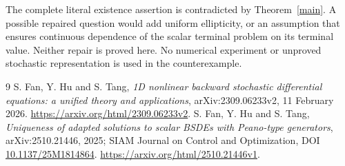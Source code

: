 \documentclass[11pt]{article}
\begin{document}
The complete literal existence assertion is contradicted by
Theorem~\ref{main}. A possible repaired question would add uniform
ellipticity, or an assumption that ensures continuous dependence of the
scalar terminal problem on its terminal value. Neither repair is proved
here. No numerical experiment or unproved stochastic representation is
used in the counterexample.

\begin{thebibliography}{9}
 S. Fan, Y. Hu and S. Tang,
\emph{1D nonlinear backward stochastic differential equations: a unified theory and applications}, arXiv:2309.06233v2, 11 February 2026.
\url{https://arxiv.org/html/2309.06233v2}.
 S. Fan, Y. Hu and S. Tang,
\emph{Uniqueness of adapted solutions to scalar BSDEs with Peano-type generators},
arXiv:2510.21446, 2025; SIAM Journal on Control and Optimization,
DOI \href{https://doi.org/10.1137/25M1814864}{10.1137/25M1814864}.
\url{https://arxiv.org/html/2510.21446v1}.
\end{thebibliography}
\end{document}
